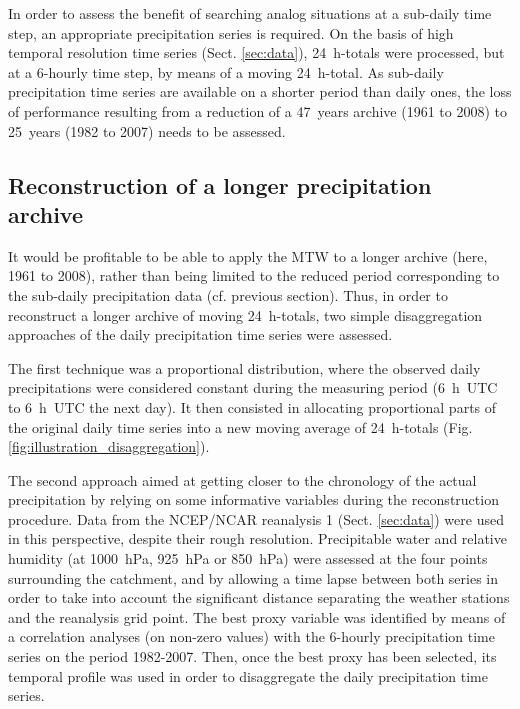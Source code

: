 \documentclass[hess, manuscript]{copernicus}
\begin{document}
In order to assess the benefit of searching analog situations at a sub-daily time step, an appropriate precipitation series is required. On the basis of high temporal resolution time series (Sect. \ref{sec:data}), 24~h-totals were processed, but at a 6-hourly time step, by means of a moving 24~h-total.  As sub-daily precipitation time series are available on a shorter period than daily ones, the loss of performance resulting from a reduction of a 47~years archive (1961 to 2008) to 25~years (1982 to 2007) needs to be assessed.


\subsection{Reconstruction of a longer precipitation archive}
\label{sec:reconstruction}

It would be profitable to be able to apply the MTW to a longer archive (here, 1961 to 2008), rather than being limited to the reduced period corresponding to the sub-daily precipitation data (cf. previous section). Thus, in order to reconstruct a longer archive of moving 24~h-totals, two simple disaggregation approaches of the daily precipitation time series were assessed.

The first technique was a proportional distribution, where the observed daily precipitations were considered constant during the measuring period (6~h~UTC to 6~h~UTC the next day). It then consisted in allocating proportional parts of the original daily time series into a new moving average of 24~h-totals (Fig. \ref{fig:illustration_disaggregation}). 

The second approach aimed at getting closer to the chronology of the actual precipitation by relying on some informative variables during the reconstruction procedure. Data from the NCEP/NCAR reanalysis 1 (Sect. \ref{sec:data}) were used in this perspective, despite their rough resolution. Precipitable water and relative humidity (at 1000~hPa, 925~hPa or 850~hPa) were assessed at the four points surrounding the catchment, and by allowing a time lapse between both series in order to take into account the significant distance separating the weather stations and the reanalysis grid point. The best proxy variable was identified by means of a correlation analyses (on non-zero values) with the 6-hourly precipitation time series on the period 1982-2007. Then, once the best proxy has been selected, its temporal profile was used in order to disaggregate the daily precipitation time series.
\end{document}
